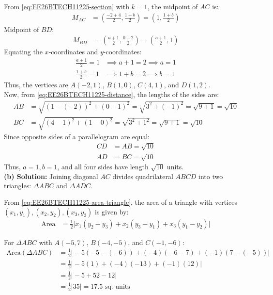 \begin{enumerate}[label=\thesubsection.\arabic*, ref=\thesubsection.\theenumi]
From \eqref{eq:EE26BTECH11225-section} with $k=1$, the midpoint of $AC$ is:
\begin{align}
    M_{AC} &= \left( \frac{-2 + 4}{2}, \frac{1 + b}{2} \right) = \left( 1, \frac{1 + b}{2} \right)
\end{align}
Midpoint of $BD$:
\begin{align}
    M_{BD} &= \left( \frac{a + 1}{2}, \frac{0 + 2}{2} \right) = \left( \frac{a + 1}{2}, 1 \right)
\end{align}
Equating the $x$-coordinates and $y$-coordinates:
\begin{align}
    \frac{a + 1}{2} = 1 &\implies a + 1 = 2 \implies a = 1 \\
    \frac{1 + b}{2} = 1 &\implies 1 + b = 2 \implies b = 1
\end{align}
Thus, the vertices are $A(-2,1)$, $B(1,0)$, $C(4,1)$, and $D(1,2)$. \\[4pt]
Now, from \eqref{eq:EE26BTECH11225-distance}, the lengths of the sides are:
\begin{align}
    AB &= \sqrt{(1 - (-2))^2 + (0 - 1)^2} = \sqrt{3^2 + (-1)^2} = \sqrt{9 + 1} = \sqrt{10} \\
    BC &= \sqrt{(4 - 1)^2 + (1 - 0)^2} = \sqrt{3^2 + 1^2} = \sqrt{9 + 1} = \sqrt{10}
\end{align}
Since opposite sides of a parallelogram are equal:
\begin{align}
    CD &= AB = \sqrt{10} \\
    AD &= BC = \sqrt{10}
\end{align}
Thus, $a = 1, b = 1$, and all four sides have length $\sqrt{10}$ units. \\[8pt]
\textbf{(b) Solution:} Joining diagonal $AC$ divides quadrilateral $ABCD$ into two triangles: $\Delta ABC$ and $\Delta ADC$.

From \eqref{eq:EE26BTECH11225-area-triangle}, the area of a triangle with vertices $(x_1,y_1), (x_2,y_2), (x_3,y_3)$ is given by:
\begin{align}
    \text{Area} &= \frac{1}{2} \big| x_1(y_2 - y_3) + x_2(y_3 - y_1) + x_3(y_1 - y_2) \big|
\end{align}

For $\Delta ABC$ with $A(-5,7)$, $B(-4,-5)$, and $C(-1,-6)$:
\begin{align}
    \text{Area}(\Delta ABC) &= \frac{1}{2} \big| -5(-5 - (-6)) + (-4)(-6 - 7) + (-1)(7 - (-5)) \big| \\
    &= \frac{1}{2} \big| -5(1) + (-4)(-13) + (-1)(12) \big| \\
    &= \frac{1}{2} \big| -5 + 52 - 12 \big| \\
    &= \frac{1}{2} |35| = 17.5\text{ sq. units}
\end{align}


\end{enumerate}
